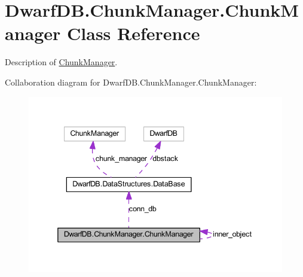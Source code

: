 \hypertarget{class_dwarf_d_b_1_1_chunk_manager_1_1_chunk_manager}{
\section{DwarfDB.ChunkManager.ChunkManager Class Reference}
\label{class_dwarf_d_b_1_1_chunk_manager_1_1_chunk_manager}
}


Description of \hyperlink{class_dwarf_d_b_1_1_chunk_manager_1_1_chunk_manager}{ChunkManager}.  




Collaboration diagram for DwarfDB.ChunkManager.ChunkManager:
\nopagebreak
\begin{figure}[H]
\begin{center}
\leavevmode
\includegraphics[width=341pt]{class_dwarf_d_b_1_1_chunk_manager_1_1_chunk_manager__coll__graph}
\end{center}
\end{figure}
